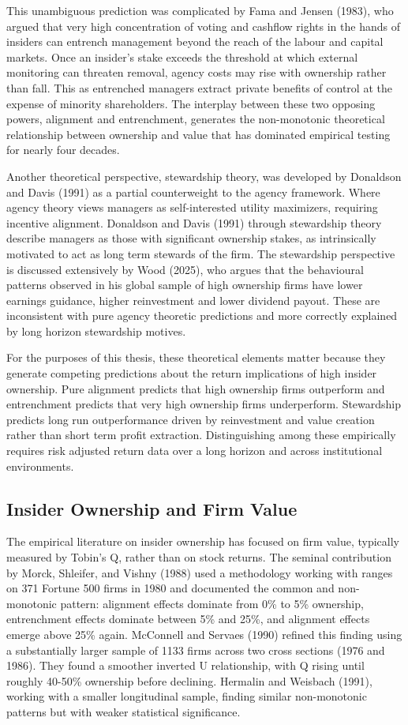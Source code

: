 This unambiguous prediction was complicated by Fama and Jensen (1983), who argued that very high concentration of voting and cashflow rights in the hands of insiders can entrench management beyond the reach of the labour and capital markets. Once an insider's stake exceeds the threshold at which external monitoring can threaten removal, agency costs may rise with ownership rather than fall. This as entrenched managers extract private benefits of control at the expense of minority shareholders. The interplay between these two opposing powers, alignment and entrenchment, generates the non-monotonic theoretical relationship between ownership and value that has dominated empirical testing for nearly four decades.

Another theoretical perspective, stewardship theory, was developed by Donaldson and Davis (1991) as a partial counterweight to the agency framework. Where agency theory views managers as self-interested utility maximizers, requiring incentive alignment. Donaldson and Davis (1991) through stewardship theory describe managers as those with significant ownership stakes, as intrinsically motivated to act as long term stewards of the firm. The stewardship perspective is discussed extensively by Wood (2025), who argues that the behavioural patterns observed in his global sample of high ownership firms have lower earnings guidance, higher reinvestment and lower dividend payout. These are inconsistent with pure agency theoretic predictions and more correctly explained by long horizon stewardship motives.

For the purposes of this thesis, these theoretical elements matter because they generate competing predictions about the return implications of high insider ownership. Pure alignment predicts that high ownership firms outperform and entrenchment predicts that very high ownership firms underperform. Stewardship predicts long run outperformance driven by reinvestment and value creation rather than short term profit extraction. Distinguishing among these empirically requires risk adjusted return data over a long horizon and across institutional environments.


\subsection{Insider Ownership and Firm Value}

The empirical literature on insider ownership has focused on firm value, typically measured by Tobin's Q, rather than on stock returns. The seminal contribution by Morck, Shleifer, and Vishny (1988) used a methodology working with ranges on 371 Fortune 500 firms in 1980 and documented the common and non-monotonic pattern: alignment effects dominate from 0\% to 5\% ownership, entrenchment effects dominate between 5\% and 25\%, and alignment effects emerge above 25\% again. McConnell and Servaes (1990) refined this finding using a substantially larger sample of 1133 firms across two cross sections (1976 and 1986). They found a smoother inverted U relationship, with Q rising until roughly 40-50\% ownership before declining. Hermalin and Weisbach (1991), working with a smaller longitudinal sample, finding similar non-monotonic patterns but with weaker statistical significance.

